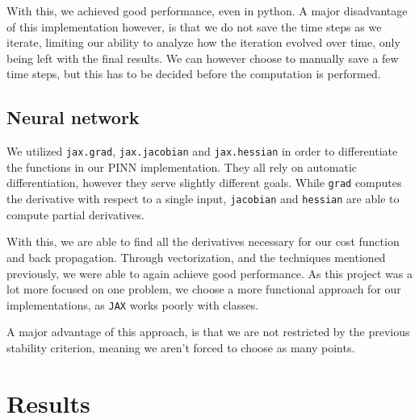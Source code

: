 \documentclass{article}
\theoremstyle{definition}
\begin{document}

With this, we achieved good performance, even in python. A major disadvantage of this implementation however, is that we do not save the time steps as we iterate, limiting our ability to analyze how the iteration evolved over time, only being left with the final results. We can however choose to manually save a few time steps, but this has to be decided before the computation is performed.

\subsection{Neural network}
We utilized \verb|jax.grad|, \verb|jax.jacobian| and \verb|jax.hessian| in order to differentiate the functions in our PINN implementation. They all rely on automatic differentiation, however they serve slightly different goals. While \verb|grad| computes the derivative with respect to a single input, \verb|jacobian| and \verb|hessian| are able to compute partial derivatives.

With this, we are able to find all the derivatives necessary for our cost function and back propagation. Through vectorization, and the techniques mentioned previously, we were able to again achieve good performance. As this project was a lot more focused on one problem, we choose a more functional approach for our implementations, as \verb|JAX| works poorly with classes.

A major advantage of this approach, is that we are not restricted by the previous stability criterion, meaning we aren't forced to choose as many points.

\newpage

\section{Results}
\end{document}
